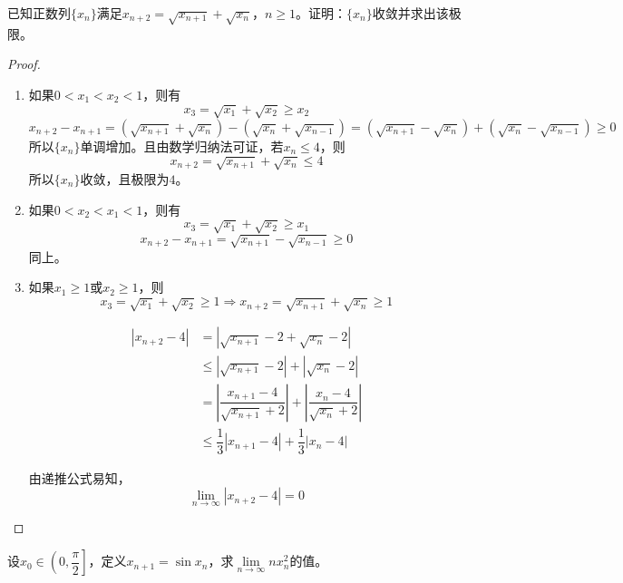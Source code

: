 \begin{proposition}
    
    已知正数列$\{x_n\}$满足$x_{n + 2} = \sqrt{x_{n + 1}} + \sqrt{x_{n}}$，$n \geq 1$。证明：$\{x_n\}$收敛并求出该极限。

\end{proposition}

\begin{proof}

    \begin{enumerate}

        \item 如果$0 < x_1 < x_2 < 1$，则有
            $$x_3 = \sqrt{x_1} + \sqrt{x_2} \geq x_2$$
            $$x_{n + 2} - x_{n + 1} = (\sqrt{x_{n + 1}} + \sqrt{x_{n}}) - (\sqrt{x_{n}} + \sqrt{x_{n - 1}}) = (\sqrt{x_{n + 1}} - \sqrt{x_{n}}) + (\sqrt{x_{n}} - \sqrt{x_{n - 1}}) \geq 0$$
            所以$\{x_n\}$单调增加。且由数学归纳法可证，若$x_n \leq 4$，则
            $$x_{n + 2} = \sqrt{x_{n + 1}} + \sqrt{x_{n}} \leq 4$$
            所以$\{x_n\}$收敛，且极限为$4$。
        \item 如果$0 < x_2 < x_1 < 1$，则有
            $$x_3 = \sqrt{x_1} + \sqrt{x_2} \geq x_1$$
            $$x_{n + 2} - x_{n + 1} = \sqrt{x_{n + 1}} - \sqrt{x_{n - 1}} \geq 0$$
            同上。
        \item 如果$x_1 \geq 1$或$x_2 \geq 1$，则
            $$x_3 = \sqrt{x_1} + \sqrt{x_2} \geq 1 \Longrightarrow x_{n + 2} = \sqrt{x_{n + 1}} + \sqrt{x_{n}} \geq 1$$
            
            \begin{align*}
                |x_{n + 2} - 4| & = |\sqrt{x_{n + 1}} - 2 + \sqrt{x_{n}} - 2| \\
                & \leq |\sqrt{x_{n + 1}} - 2| + |\sqrt{x_{n}} - 2| \\
                & = \left|\dfrac{x_{n + 1} - 4}{\sqrt{x_{n + 1}} + 2}\right| + \left|\dfrac{x_{n} - 4}{\sqrt{x_{n}} + 2}\right| \\
                & \leq \dfrac{1}{3} |x_{n + 1} - 4| + \dfrac{1}{3}|x_n - 4| 
            \end{align*}

            由递推公式易知，
            $$\lim\limits_{n \to \infty}{|x_{n + 2} - 4|} = 0$$

    \end{enumerate}

\end{proof}

\begin{proposition}

    设$x_0 \in \left(0, \dfrac{\pi}{2}\right]$，定义$x_{n + 1} = \sin{x_n}$，求$\lim\limits_{n \to\infty}{nx_n^2}$的值。

\end{proposition}

